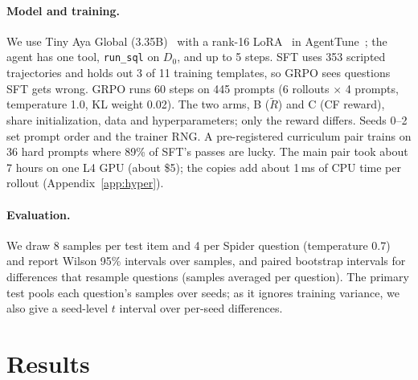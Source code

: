 \documentclass{article}
\begin{document}
\paragraph{Model and training.}
We use Tiny Aya Global (3.35B)~\citep{salamanca2026tiny} with a rank-16 LoRA~\citep{hu2021lora} in AgentTune~\citep{e2026agenttune}; the agent has one tool, \texttt{run\_sql} on $D_0$, and up to 5 steps. SFT uses 353 scripted trajectories and holds out 3 of 11 training templates, so GRPO sees questions SFT gets wrong. GRPO runs 60 steps on 445 prompts (6 rollouts $\times$ 4 prompts, temperature 1.0, KL weight 0.02). The two arms, B ($\tilde R$) and C (CF reward), share initialization, data and hyperparameters; only the reward differs. Seeds 0--2 set prompt order and the trainer RNG. A pre-registered curriculum pair trains on 36 hard prompts where 89\% of SFT's passes are lucky. The main pair took about 7 hours on one L4 GPU (about \$5); the copies add about 1\,ms of CPU time per rollout (Appendix~\ref{app:hyper}).

\paragraph{Evaluation.}
We draw 8 samples per test item and 4 per Spider question (temperature 0.7) and report Wilson 95\% intervals over samples, and paired bootstrap intervals for differences that resample questions (samples averaged per question). The primary test pools each question's samples over seeds; as it ignores training variance, we also give a seed-level $t$ interval over per-seed differences.

\begin{table}[t]
  \caption{\textbf{Hidden copies cut false accepts without rejecting correct queries.} Share paid in full or rejected (\%, Wilson 95\% CI; 1,814 mutants, 2,839 hacks and 2,847 correct queries on 1,302 audit items). $\downarrow$: lower is better; bold: best with blind copies. $^\dagger$Copies chosen knowing the mutants.}
  \label{tab:audit}
  \centering
  \small\setlength{\tabcolsep}{3.5pt}
  
\end{table}

\section{Results}
\label{sec:results}
\end{document}
